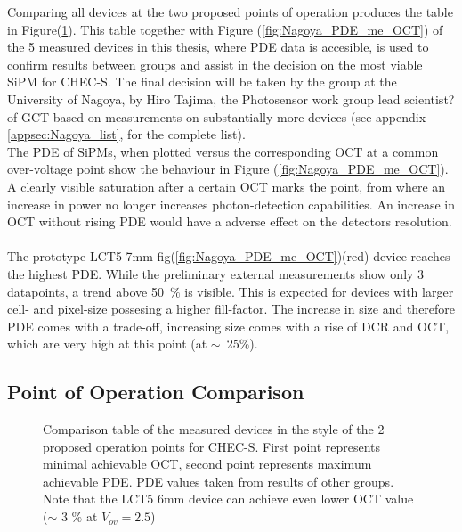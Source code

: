 \documentclass[12pt,article,type=msc,colorback,accentcolor=tud9c]{tudthesis}
\begin{document}
{Comparing all devices at the two proposed points of operation produces the table in Figure(\ref{fig:DC_Table}). This table together with Figure (\ref{fig:Nagoya_PDE_me_OCT}) of the 5 measured devices in this thesis, where PDE data is accesible, is used to confirm results between groups and assist in the decision on the most viable SiPM for CHEC-S. The final decision will be taken by the group at the University of Nagoya, by Hiro Tajima, the Photosensor work group lead scientist? of GCT based on measurements on substantially more devices (see appendix \ref{appsec:Nagoya_list}, for the complete list).\\
The PDE of SiPMs, when plotted versus the corresponding OCT at a common over-voltage point show the behaviour in Figure (\ref{fig:Nagoya_PDE_me_OCT}). A clearly visible saturation  after a certain OCT marks the point, from where an increase in power no longer increases photon-detection capabilities. An increase in OCT without rising PDE would have a adverse effect on the detectors resolution.\\\\
The prototype LCT5 7mm fig(\ref{fig:Nagoya_PDE_me_OCT})(red) device reaches the highest PDE. While the preliminary external measurements show only 3 datapoints, a trend above 50~$\%$ is visible. This is expected for devices with larger cell- and pixel-size possesing a higher fill-factor. The increase in size and therefore PDE comes with a trade-off, increasing size comes with a rise of DCR and OCT, which are very high at this point (at $\sim$~25$\%$). 

\newpage
\subsection{Point of Operation Comparison}
\begin{figure}[h]
\begin{centering}
\caption{Comparison table of the measured devices in the style of the 2 proposed operation points for CHEC-S. First point represents minimal achievable OCT, second point represents maximum achievable PDE. PDE values taken from results of other groups. Note that the LCT5 6mm device can achieve even lower OCT value ($\sim$ 3 $\%$ at $V_{ov}=2.5$)}
\label{fig:DC_Table}
\end{centering}
\end{figure}


}
\end{document}
